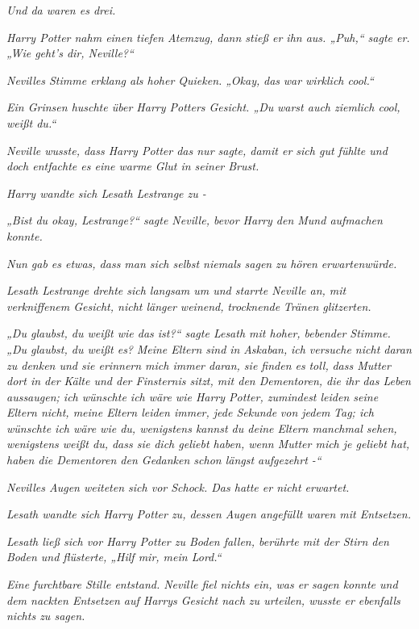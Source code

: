 {\emph{Und da waren es drei.}

\emph{Harry Potter nahm einen tiefen Atemzug, dann stieß er ihn aus. „Puh,“ sagte er. „Wie geht's dir, Neville?“}

\emph{Nevilles Stimme erklang als hoher Quieken. „Okay,} \emph{\emph{das}} \emph{war wirklich cool.“}

\emph{Ein Grinsen huschte über Harry Potters Gesicht. „\emph{Du}} \emph{warst auch ziemlich cool, weißt du.“}

\emph{Neville wusste, dass Harry Potter das nur sagte, damit er sich gut fühlte und doch entfachte es eine warme Glut in seiner Brust.}

\emph{Harry wandte sich Lesath Lestrange zu -}

\emph{„Bist du okay, Lestrange?“ sagte Neville, bevor Harry den Mund aufmachen konnte.}

\emph{Nun gab es etwas, dass man sich selbst niemals sagen} \emph{zu hören} \emph{erwartenwürde.}

\emph{Lesath Lestrange drehte sich langsam um und starrte Neville an, mit verkniffenem Gesicht, nicht länger weinend,} \emph{trocknende} \emph{Tränen glitzerten.}

\emph{„Du glaubst, du weißt wie das ist?“ sagte Lesath mit hoher, bebender Stimme. „\emph{Du glaubst, du weißt es?}} \emph{Meine Eltern sind in} \emph{\emph{Askaban,}} \emph{ich versuche nicht daran zu denken und sie erinnern mich immer daran, sie finden es} \emph{\emph{toll,}} \emph{dass Mutter dort in der Kälte und der Finsternis sitzt, mit den Dementoren, die ihr das Leben aussaugen; ich wünschte ich wäre wie Harry Potter, zumindest leiden seine Eltern nicht, meine Eltern leiden immer, jede Sekunde} \emph{von jedem} \emph{Tag; ich wünschte ich wäre wie du, wenigstens kannst du deine Eltern manchmal sehen, wenigstens weißt du, dass sie dich geliebt haben, wenn Mutter mich je geliebt hat, haben die Dementoren den Gedanken schon längst aufgezehrt -“}

\emph{Nevilles Augen weiteten sich vor Schock. Das hatte er nicht erwartet.}

\emph{Lesath wandte sich Harry Potter zu, dessen Augen angefüllt waren mit Entsetzen.}

\emph{Lesath ließ sich vor Harry Potter zu Boden fallen, berührte mit der Stirn den Boden und flüsterte, „Hilf mir, mein Lord.“}

\emph{Eine furchtbare Stille entstand. Neville fiel nichts ein, was er sagen konnte und dem nackten Entsetzen auf Harrys Gesicht nach zu urteilen, wusste er ebenfalls nichts zu sagen.}

}
